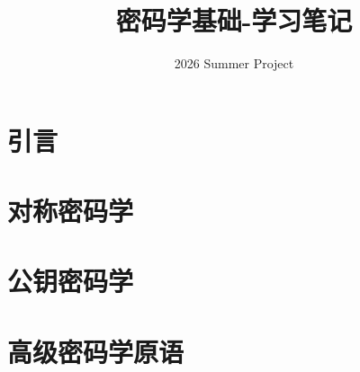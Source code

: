 \documentclass[UTF8]{ctexbook}
\begin{document}
\frontmatter

\title{密码学基础-学习笔记}
\author{2026 Summer Project}
\maketitle

\tableofcontents

\mainmatter


\part{引言}


\part{对称密码学}


%
%
%


\part{公钥密码学}

%
%
%


\part{高级密码学原语}

%
%
%
%
%
\end{document}
